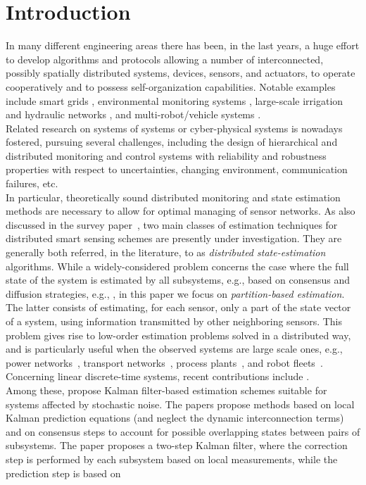 \documentclass[journal,10pt,draftcls,onecolumn]{IEEEtran}
\begin{document}
\section{Introduction}
In many different engineering areas there has been, in the last years, a huge effort to develop algorithms and protocols allowing a number of interconnected, possibly spatially distributed systems, devices, sensors, and actuators, to operate cooperatively and to possess self-organization capabilities. Notable examples include smart grids \cite{Resende11}, environmental monitoring systems \cite{EMMON11}, large-scale irrigation and hydraulic networks \cite{Cantoni07,MaeDoa:12-007}, and multi-robot/vehicle systems \cite{MartinezCortesBullo07,Murray07}.\\
Related research on systems of systems \cite{Samad2011} or cyber-physical systems \cite{Antsaklis2013} is nowadays fostered, pursuing several challenges, including the design of hierarchical and distributed monitoring and control systems with reliability and robustness properties with respect to uncertainties, changing environment, communication failures, etc.\\
In particular, theoretically sound distributed monitoring and state estimation methods are necessary to allow for optimal managing of sensor networks. As also discussed in the survey paper~\cite{Sijs_Lazar_et_al_2008}, two main classes of estimation techniques for distributed smart sensing schemes are presently under investigation. They are generally both referred, in the literature, to as \emph{distributed state-estimation} algorithms. While a widely-considered problem concerns the case where the full state of the system is estimated by all subsystems, e.g., based on consensus and diffusion strategies, e.g., \cite{Saber07CDC,diffusion_d_est,TACFFS09}, in this paper we focus on \emph{partition-based estimation}. The latter consists of estimating, for each sensor, only a part of the state vector of a system, using information transmitted by other neighboring sensors. This problem gives rise to low-order estimation problems solved in a distributed way, and is particularly useful when the observed systems are large scale ones, e.g., power networks~\cite{Siljac78,FP-RC-FB:12}, transport networks~\cite{s1978}, process plants~\cite{Vadigepalli2003}, and robot fleets~\cite{Mutambara_Durrant-Whyte2000}.\\
Concerning linear discrete-time systems, recent contributions include \cite{Vadigepalli2003,Khan2008,Stankovic09,Farina2010,Farina2011b,Negenborn-Kalman13,Haber13,Riverso2013b,Riverso2013e}.\\ Among these, \cite{Vadigepalli2003,Khan2008,Stankovic09,Negenborn-Kalman13} propose Kalman filter-based estimation schemes suitable for systems affected by stochastic noise. The papers \cite{Vadigepalli2003,Stankovic09} propose methods based on local Kalman prediction equations (and neglect the dynamic interconnection terms) and on consensus steps to account for possible overlapping states between pairs of subsystems. The paper \cite{Khan2008} proposes a two-step Kalman filter, where the correction step is performed by each subsystem based on local measurements, while the prediction step is based on
\end{document}
